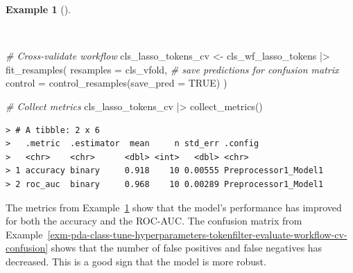 \documentclass[
  letterpaper,
]{latex/krantz}
\newenvironment{Shaded}{\begin{snugshade}}{\end{snugshade}}
\newcommand{\AttributeTok}[1]{\textcolor[rgb]{0.00,0.00,0.00}{#1}}
\newcommand{\CommentTok}[1]{\textcolor[rgb]{0.00,0.00,0.00}{\textit{#1}}}
\newcommand{\ConstantTok}[1]{\textcolor[rgb]{0.00,0.00,0.00}{#1}}
\newcommand{\FunctionTok}[1]{\textcolor[rgb]{0.00,0.00,0.00}{#1}}
\newcommand{\NormalTok}[1]{\textcolor[rgb]{0.00,0.00,0.00}{#1}}
\newcommand{\OtherTok}[1]{\textcolor[rgb]{0.00,0.00,0.00}{#1}}
\newcommand{\SpecialCharTok}[1]{\textcolor[rgb]{0.00,0.00,0.00}{#1}}
\theoremstyle{definition}
\newtheorem{example}{Example}[chapter]
\theoremstyle{remark}
\begin{document}
\begin{example}[]\protect\hypertarget{exm-pda-class-tune-hyperparameters-tokenfilter-evaluate-workflow-cv-collect}{}\label{exm-pda-class-tune-hyperparameters-tokenfilter-evaluate-workflow-cv-collect}

~

\begin{Shaded}
\begin{Highlighting}[]
\CommentTok{\# Cross{-}validate workflow}
\NormalTok{cls\_lasso\_tokens\_cv }\OtherTok{\textless{}{-}}
\NormalTok{  cls\_wf\_lasso\_tokens }\SpecialCharTok{|\textgreater{}}
  \FunctionTok{fit\_resamples}\NormalTok{(}
    \AttributeTok{resamples =}\NormalTok{ cls\_vfold,}
    \CommentTok{\# save predictions for confusion matrix}
    \AttributeTok{control =} \FunctionTok{control\_resamples}\NormalTok{(}\AttributeTok{save\_pred =} \ConstantTok{TRUE}\NormalTok{)}
\NormalTok{  )}

\CommentTok{\# Collect metrics}
\NormalTok{cls\_lasso\_tokens\_cv }\SpecialCharTok{|\textgreater{}}
  \FunctionTok{collect\_metrics}\NormalTok{()}
\end{Highlighting}
\end{Shaded}

\begin{verbatim}
> # A tibble: 2 x 6
>   .metric  .estimator  mean     n std_err .config             
>   <chr>    <chr>      <dbl> <int>   <dbl> <chr>               
> 1 accuracy binary     0.918    10 0.00555 Preprocessor1_Model1
> 2 roc_auc  binary     0.968    10 0.00289 Preprocessor1_Model1
\end{verbatim}

\end{example}

The metrics from
Example~\ref{exm-pda-class-tune-hyperparameters-tokenfilter-evaluate-workflow-cv-collect}
show that the model's performance has improved for both the accuracy and
the ROC-AUC. The confusion matrix from
Example~\ref{exm-pda-class-tune-hyperparameters-tokenfilter-evaluate-workflow-cv-confusion}
shows that the number of false positives and false negatives has
decreased. This is a good sign that the model is more robust.
\end{document}
